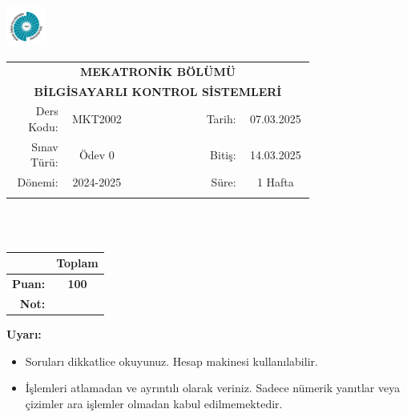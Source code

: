 \newcommand\UniversiteAdi{Niğde Ömer Halisdemir Üniversitesi}
\newcommand\BolumAdi{MEKATRONİK BÖLÜMÜ}
\newcommand\DersKodu{MKT2002}
\newcommand\DersAdi{BİLGİSAYARLI KONTROL SİSTEMLERİ}
\newcommand\SinavAdi{Ödev 0}
\newcommand\SinavTarihi{07.03.2025}
\newcommand\SinavSaati{14.03.2025}
\newcommand\SinavSuresi{1 Hafta}
\pagestyle{fancy}
\fancyhf{} %
\noindent \includegraphics[width=0.1\textwidth]{logo}
\begin{tabular}{
    p{0.15\linewidth}
    p{0.15\linewidth}
    p{0.2\linewidth}
    p{0.1\linewidth}
    p{0.15\linewidth}}
    \multicolumn{5}{c}{\textbf{\BolumAdi}}\\
    \multicolumn{5}{c}{\textbf{\DersAdi}}\\\hline
    \multicolumn{1}{|r|}{Ders Kodu:}&
    \multicolumn{1}{|c|}{\DersKodu}&
    \multicolumn{1}{|c|}{}& 
    \multicolumn{1}{|r|}{Tarih:}&
    \multicolumn{1}{|c|}{\SinavTarihi} \\\hline
    \multicolumn{1}{|r|}{Sınav Türü:}&
    \multicolumn{1}{|c|}{\SinavAdi}&  
    \multicolumn{1}{|c|}{}&
    \multicolumn{1}{|r|}{Bitiş:}&
    \multicolumn{1}{|c|}{\SinavSaati}\\\hline
    \multicolumn{1}{|r|}{Dönemi:}&
    \multicolumn{1}{|c|}{2024-2025}&
    \multicolumn{1}{|c|}{}&
    \multicolumn{1}{|r|}{Süre:}&
    \multicolumn{1}{|c|}{\SinavSuresi} \\\hline
    &&&&\\
\end{tabular}\\\\
\noindent\begin{center}
\begin{tabular}{|r|c|}\hline
    &\textbf{Toplam}\\\hline
    \textbf{Puan:} &\textbf{100}\\\hline
    \textbf{Not:}  &\\\hline
\end{tabular}\end{center}
\noindent\textbf{Uyarı:}
\begin{itemize}\bfseries
    \item Soruları dikkatlice okuyunuz. Hesap makinesi kullanılabilir.
    \item İşlemleri atlamadan ve ayrıntılı olarak veriniz. Sadece nümerik yanıtlar veya çizimler ara işlemler olmadan kabul edilmemektedir.
\end{itemize}
